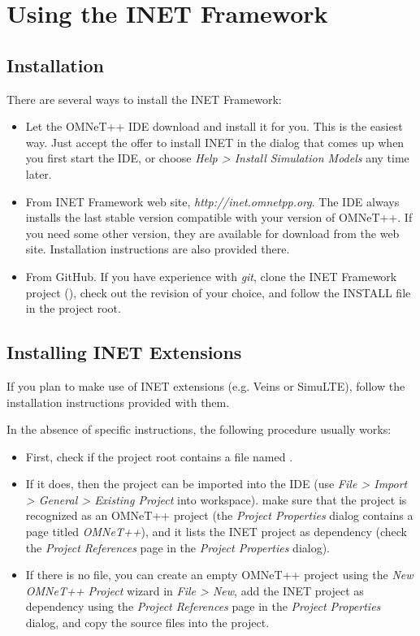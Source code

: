 \chapter{Using the INET Framework}
\label{cha:usage}

\section{Installation}

There are several ways to install the INET Framework:

\begin{itemize}
  \item Let the OMNeT++ IDE download and install it for you. 
      This is the easiest way. Just accept the offer to install INET
      in the dialog that comes up when you first start the IDE, or
      choose \textit{Help > Install Simulation Models} any time later.
  \item From INET Framework web site, \textit{http://inet.omnetpp.org}. 
      The IDE always installs the last stable version compatible with
      your version of OMNeT++. If you need some other version, they
      are available for download from the web site. Installation
      instructions are also provided there.  
  \item From GitHub. If you have experience with \textit{git}, 
      clone the INET Framework project (), 
      check out the revision of your choice, and follow the INSTALL 
      file in the project root.
\end{itemize}
 
 
\section{Installing INET Extensions}

If you plan to make use of INET extensions (e.g. Veins or SimuLTE),
follow the installation instructions provided with them. 

In the absence of specific instructions, the following procedure usually works: 

\begin{itemize}
 \item First, check if the project root contains a file named .
 \item If it does, then the project can be imported into the IDE (use \textit{File > Import >
    General > Existing Project} into workspace). make sure that the project is recognized
    as an OMNeT++ project (the \textit{Project Properties} dialog contains a page
    titled \textit{OMNeT++}), and it lists the INET project as dependency 
    (check the \textit{Project References} page in the \textit{Project Properties} dialog).
 \item If there is no  file, you can create an empty OMNeT++
    project using the \textit{New OMNeT++ Project} wizard in \textit{File > New}, 
    add the INET project as dependency using the \textit{Project References} page 
    in the \textit{Project Properties} dialog, and copy the source files into the project.
\end{itemize}

